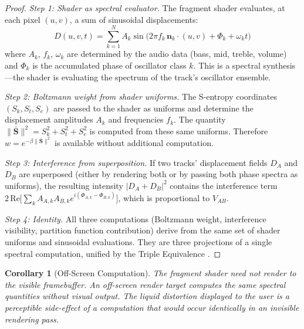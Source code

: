 \documentclass[11pt,twocolumn,a4paper]{article}
\newtheorem{corollary}[theorem]{Corollary}
\newcommand{\Sk}{S_k}
\newcommand{\St}{S_t}
\newcommand{\Se}{S_e}
\begin{document}
\begin{proof}
\textit{Step 1: Shader as spectral evaluator.}
The fragment shader evaluates, at each pixel $(u, v)$, a sum of
sinusoidal displacements:
\begin{equation}
  D(u, v, t) = \sum_{k=1}^{N} A_k \sin\!\bigl(2\pi f_k\,
  \mathbf{n}_k \cdot (u, v) + \Phi_k + \omega_k t\bigr)
  \label{eq:shader-displacement}
\end{equation}
where $A_k$, $f_k$, $\omega_k$ are determined by the audio data
(bass, mid, treble, volume) and $\Phi_k$ is the accumulated phase of
oscillator class $k$. This is a spectral synthesis---the shader is
evaluating the spectrum of the track's oscillator ensemble.

\textit{Step 2: Boltzmann weight from shader uniforms.}
The S-entropy coordinates $(\Sk, \St, \Se)$ are passed to the shader
as uniforms and determine the displacement amplitudes $A_k$ and
frequencies $f_k$. The quantity $\|\bar{\mathbf{S}}\|^2 = \Sk^2 +
\St^2 + \Se^2$ is computed from these same uniforms. Therefore
$w = e^{-\beta\|\bar{\mathbf{S}}\|^2}$ is available without
additional computation.

\textit{Step 3: Interference from superposition.}
If two tracks' displacement fields $D_A$ and $D_B$ are superposed
(either by rendering both or by passing both phase spectra as
uniforms), the resulting intensity $|D_A + D_B|^2$ contains the
interference term $2\,\mathrm{Re}\bigl[\sum_k A_{A,k} A_{B,k}
e^{i(\Phi_{A,k} - \Phi_{B,k})}\bigr]$, which is proportional to
$V_{AB}$.

\textit{Step 4: Identity.}
All three computations (Boltzmann weight, interference visibility,
partition function contribution) derive from the same set of shader
uniforms and sinusoidal evaluations. They are three projections of a
single spectral computation, unified by the Triple Equivalence
\citep{sachikonye2026categorical}.
\end{proof}

\begin{corollary}[Off-Screen Computation]
\label{cor:offscreen}
The fragment shader need not render to the visible framebuffer. An
off-screen render target computes the same spectral quantities without
visual output. The liquid distortion displayed to the user is a
perceptible side-effect of a computation that would occur identically
in an invisible rendering pass.
\end{corollary}


\end{document}
